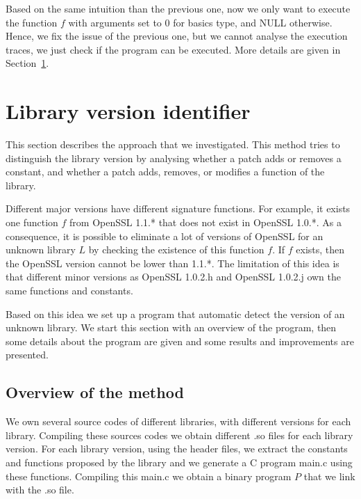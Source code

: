 \documentclass{article}
\begin{document}
	Based on the same intuition than the previous one, now we only want to execute the function $f$ with arguments set to $0$ for basics type, and NULL otherwise. Hence, we fix the issue of the previous one, but we cannot analyse the execution traces, we just check if the program can be executed. More details are given in Section~\ref{section:libraryChecker}.
	



\section{Library version identifier}
\label{section:libraryChecker}

	This section describes the approach that we investigated. This method tries to distinguish the library version by analysing whether a patch adds or removes a constant, and whether a patch adds, removes, or modifies a function of the library.
	   
    Different major versions have different signature functions. For example, it exists one function $f$ from OpenSSL 1.1.* that does not exist in OpenSSL 1.0.*. As a consequence, it is possible to eliminate a lot of versions of OpenSSL for an unknown library $L$ by checking the existence of this function $f$. If $f$ exists, then the OpenSSL version cannot be lower than 1.1.*. The limitation of this idea is that different minor versions as OpenSSL 1.0.2.h and OpenSSL 1.0.2.j own the same functions and constants.
   
Based on this idea we set up a program that automatic detect the version of an unknown library. We start this section with an overview of the program, then some details about the program are given and some results and improvements are presented.

	\subsection{Overview of the method}
   

	
	We own several source codes of different libraries, with different versions for each library. Compiling these sources codes we obtain different .so files for each library version. 
	For each library version, using the header files, we extract the constants and functions proposed by the library and we generate a C program main.c using these functions. Compiling this main.c we obtain a binary program $P$ that we link with the .so file.
\end{document}
